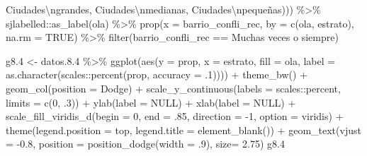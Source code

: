 \documentclass[
  12pt,
]{book}
\newenvironment{Shaded}{\begin{snugshade}}{\end{snugshade}}
\newcommand{\AttributeTok}[1]{\textcolor[rgb]{0.77,0.63,0.00}{#1}}
\newcommand{\ConstantTok}[1]{\textcolor[rgb]{0.00,0.00,0.00}{#1}}
\newcommand{\DecValTok}[1]{\textcolor[rgb]{0.00,0.00,0.81}{#1}}
\newcommand{\FloatTok}[1]{\textcolor[rgb]{0.00,0.00,0.81}{#1}}
\newcommand{\FunctionTok}[1]{\textcolor[rgb]{0.00,0.00,0.00}{#1}}
\newcommand{\NormalTok}[1]{#1}
\newcommand{\OtherTok}[1]{\textcolor[rgb]{0.56,0.35,0.01}{#1}}
\newcommand{\SpecialCharTok}[1]{\textcolor[rgb]{0.00,0.00,0.00}{#1}}
\newcommand{\StringTok}[1]{\textcolor[rgb]{0.31,0.60,0.02}{#1}}
\begin{document}
\begin{Shaded}
\begin{Highlighting}[]
                    \StringTok{\textquotesingle{}Ciudades}\SpecialCharTok{\textbackslash{}n}\StringTok{grandes\textquotesingle{}}\NormalTok{, }\StringTok{\textquotesingle{}Ciudades}\SpecialCharTok{\textbackslash{}n}\StringTok{medianas\textquotesingle{}}\NormalTok{, }\StringTok{\textquotesingle{}Ciudades}\SpecialCharTok{\textbackslash{}n}\StringTok{pequeñas\textquotesingle{}}\NormalTok{))) }\SpecialCharTok{\%\textgreater{}\%}
\NormalTok{  sjlabelled}\SpecialCharTok{::}\FunctionTok{as\_label}\NormalTok{(ola) }\SpecialCharTok{\%\textgreater{}\%} 
  \FunctionTok{prop}\NormalTok{(}\AttributeTok{x =}\NormalTok{ barrio\_confli\_rec, }\AttributeTok{by =} \FunctionTok{c}\NormalTok{(ola, estrato), }\AttributeTok{na.rm =} \ConstantTok{TRUE}\NormalTok{) }\SpecialCharTok{\%\textgreater{}\%} 
  \FunctionTok{filter}\NormalTok{(barrio\_confli\_rec }\SpecialCharTok{==} \StringTok{\textquotesingle{}Muchas veces o siempre\textquotesingle{}}\NormalTok{)}

\NormalTok{g8}\FloatTok{.4} \OtherTok{\textless{}{-}}\NormalTok{ datos.}\FloatTok{8.4} \SpecialCharTok{\%\textgreater{}\%} 
  \FunctionTok{ggplot}\NormalTok{(}\FunctionTok{aes}\NormalTok{(}\AttributeTok{y =}\NormalTok{ prop, }\AttributeTok{x =}\NormalTok{ estrato, }\AttributeTok{fill =}\NormalTok{ ola, }
             \AttributeTok{label =} \FunctionTok{as.character}\NormalTok{(scales}\SpecialCharTok{::}\FunctionTok{percent}\NormalTok{(prop, }\AttributeTok{accuracy =}\NormalTok{ .}\DecValTok{1}\NormalTok{)))) }\SpecialCharTok{+} 
  \FunctionTok{theme\_bw}\NormalTok{() }\SpecialCharTok{+} 
  \FunctionTok{geom\_col}\NormalTok{(}\AttributeTok{position =} \StringTok{\textquotesingle{}Dodge\textquotesingle{}}\NormalTok{) }\SpecialCharTok{+}
  \FunctionTok{scale\_y\_continuous}\NormalTok{(}\AttributeTok{labels =}\NormalTok{ scales}\SpecialCharTok{::}\NormalTok{percent,}
                     \AttributeTok{limits =} \FunctionTok{c}\NormalTok{(}\DecValTok{0}\NormalTok{, .}\DecValTok{3}\NormalTok{)) }\SpecialCharTok{+}
  \FunctionTok{ylab}\NormalTok{(}\AttributeTok{label =} \ConstantTok{NULL}\NormalTok{) }\SpecialCharTok{+}
  \FunctionTok{xlab}\NormalTok{(}\AttributeTok{label =} \ConstantTok{NULL}\NormalTok{) }\SpecialCharTok{+}
  \FunctionTok{scale\_fill\_viridis\_d}\NormalTok{(}\AttributeTok{begin =} \DecValTok{0}\NormalTok{, }\AttributeTok{end =}\NormalTok{ .}\DecValTok{85}\NormalTok{, }\AttributeTok{direction =} \SpecialCharTok{{-}}\DecValTok{1}\NormalTok{, }\AttributeTok{option =} \StringTok{\textquotesingle{}viridis\textquotesingle{}}\NormalTok{) }\SpecialCharTok{+}
  \FunctionTok{theme}\NormalTok{(}\AttributeTok{legend.position =} \StringTok{\textquotesingle{}top\textquotesingle{}}\NormalTok{,}
        \AttributeTok{legend.title =} \FunctionTok{element\_blank}\NormalTok{()) }\SpecialCharTok{+}
  \FunctionTok{geom\_text}\NormalTok{(}\AttributeTok{vjust =} \SpecialCharTok{{-}}\FloatTok{0.8}\NormalTok{,}
            \AttributeTok{position =} \FunctionTok{position\_dodge}\NormalTok{(}\AttributeTok{width =}\NormalTok{ .}\DecValTok{9}\NormalTok{),}
            \AttributeTok{size=} \FloatTok{2.75}\NormalTok{)}
\NormalTok{g8}\FloatTok{.4}
\end{Highlighting}
\end{Shaded}
\end{document}
